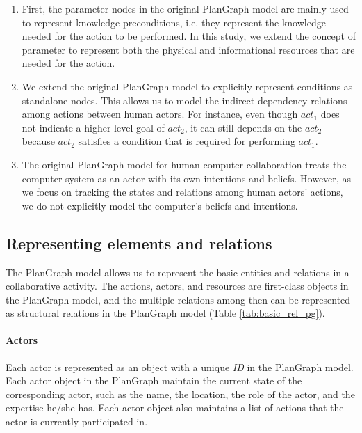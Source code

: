 \begin{enumerate}
 	\item First, the parameter nodes in the original PlanGraph model are mainly used to represent knowledge preconditions, i.e. they represent the knowledge needed for the action to be performed. In this study, we extend the concept of parameter to represent both the physical and informational resources that are needed for the action.
 	\item We extend the original PlanGraph model to explicitly represent conditions as standalone nodes. This allows us to model the indirect dependency relations among actions between human actors. For instance, even though $act_1$ does not indicate a higher level goal of $act_2$, it can still depends on the $act_2$ because $act_2$ satisfies a condition that is required for performing $act_1$.
 	\item The original PlanGraph model for human-computer collaboration treats the computer system as an actor with its own intentions and beliefs. However, as we focus on tracking the states and relations among human actors' actions, we do not explicitly model the computer's beliefs and intentions.
 \end{enumerate} 

\subsection{Representing elements and relations} %
\label{sub:representing_activities}
The PlanGraph model allows us to represent the basic entities and relations in a collaborative activity. The actions, actors, and resources are first-class objects in the PlanGraph model, and the multiple relations among then can be represented as structural relations in the PlanGraph model (Table \ref{tab:basic_rel_pg}). 

\paragraph*{Actors} %
\label{par:actors_in_plangraph}
Each actor is represented as an object with a unique \emph{ID} in the PlanGraph model. Each actor object in the PlanGraph maintain the current state of the corresponding actor, such as the name, the location, the role of the actor, and the expertise he/she has. Each actor object also maintains a list of actions that the actor is currently participated in.

